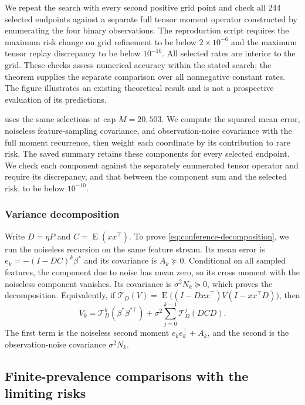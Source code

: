 \documentclass{alt2027}
\DeclareMathOperator{\E}{E}
\begin{document}
We repeat the search with every second positive grid point and check all 244
selected endpoints against a separate full tensor moment operator constructed by
enumerating the four binary observations. The reproduction script requires the
maximum risk change on grid refinement to be below $2 \times 10^{-6}$ and the
maximum tensor replay discrepancy to be below $10^{-10}$. All selected rates are
interior to the grid. These checks assess numerical accuracy within the stated
search; the theorem supplies the separate comparison over all nonnegative
constant rates. The figure illustrates an existing theoretical result and is not
a prospective evaluation of its predictions.

 uses the same selections at cap $M = 20{,}503$.
We compute the squared mean error, noiseless feature-sampling covariance, and
observation-noise covariance with the full moment recurrence, then weight each
coordinate by its contribution to rare risk. The saved summary retains these
components for every selected endpoint. We check each component against the
separately enumerated tensor operator and require its discrepancy, and that
between the component sum and the selected risk, to be below $10^{-10}$.

\subsubsection{Variance decomposition}
\label{sec:variance-decomposition}

Write $D = \eta P$ and $C = \E(xx^\top)$. To prove
\cref{eq:conference-decomposition}, we run the noiseless recursion on the same
feature stream. Its mean error is $e_k = -(I - DC)^k\beta^*$ and its covariance
is $A_k \succeq 0$. Conditional on all sampled features, the component due to
noise has mean zero, so its cross moment with the noiseless component vanishes.
Its covariance is $\sigma^2N_k \succeq 0$, which proves the decomposition.
Equivalently, if
$\mathcal T_D(V) = \E\bigl((I - Dxx^\top)V(I - xx^\top D)\bigr)$, then
\[
  V_k = \mathcal T_D^k(\beta^*\beta^{*\top})
        + \sigma^2\sum_{j=0}^{k-1}\mathcal T_D^j(DCD).
\]
The first term is the noiseless second moment $e_ke_k^\top + A_k$, and the
second is the observation-noise covariance $\sigma^2N_k$.

\subsection{Finite-prevalence comparisons with the limiting risks}
\label{sec:oracle-finite}
\end{document}

